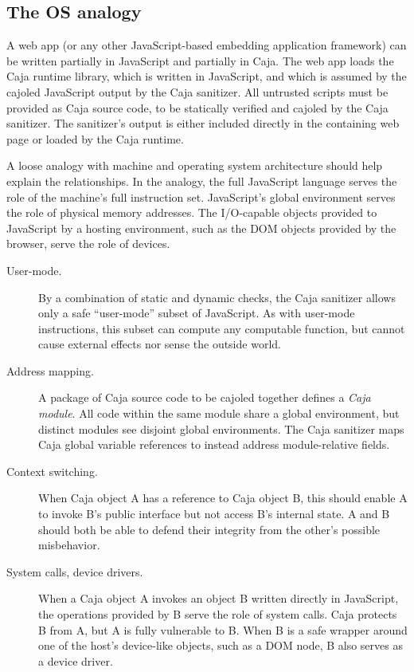 \documentclass[letterpaper,twocolumn,10pt]{article}
\begin{document}
\subsection{The OS analogy}
\label{subsec:os-analog}

A web app (or any other JavaScript-based embedding application framework) can 
be written partially in JavaScript and partially in Caja. The web app loads 
the Caja runtime library, which is written in JavaScript, and which is 
assumed by the cajoled JavaScript output by the Caja sanitizer. All 
untrusted scripts must be provided as Caja source code, to be statically 
verified and cajoled by the Caja sanitizer. The sanitizer's output is 
either included directly in the containing web page or loaded by the Caja 
runtime.

A loose analogy with machine and operating system architecture should help 
explain the relationships. In the analogy, the full JavaScript language 
serves the role of the machine's full instruction set. JavaScript's global 
environment serves the role of physical memory addresses. The I/O-capable 
objects provided to JavaScript by a hosting environment, such as the DOM 
objects provided by the browser, serve the role of devices.

\begin{description}

  \item[User-mode.] By a combination of static and dynamic checks, the Caja 
  sanitizer allows only a safe ``user-mode'' subset of JavaScript. As with 
  user-mode instructions, this subset can compute any computable function, 
  but cannot cause external effects nor sense the outside world.

  \item[Address mapping.] A package of Caja source code to be cajoled 
  together defines a \emph{Caja module}. All code within the same module 
  share a global environment, but distinct modules see disjoint global 
  environments. The Caja sanitizer maps Caja global variable references to 
  instead address module-relative fields.

  \item[Context switching.] When Caja object A has a reference to Caja 
  object B, this should enable A to invoke B's public interface but not 
  access B's internal state. A and B should both be able to defend their 
  integrity from the other's possible misbehavior.

  \item[System calls, device drivers.] When a Caja object A invokes an 
  object B written directly in JavaScript, the operations provided by B serve 
  the role of system calls. Caja protects B from A, but A is fully 
  vulnerable to B. When B is a safe wrapper around one of the host's 
  device-like objects, such as a DOM node, B also serves as a device driver.

\end{description}
\end{document}
